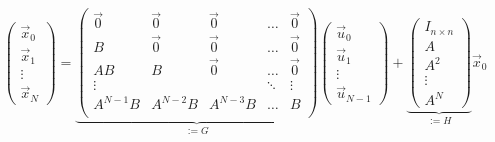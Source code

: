 \documentclass{article}
\begin{document}
\thispagestyle{empty}
$$
\begin{pmatrix}\vec{x}_0\\ \vec{x}_1 \\ \vdots \\ \vec{x}_N\end{pmatrix} =
\underbrace{\begin{pmatrix}
\vec{0}  & \vec{0}  & \vec{0}  & \dots  & \vec{0} \\
B        & \vec{0}  & \vec{0}  & \dots  & \vec{0} \\
AB       & B        & \vec{0}  & \dots  & \vec{0} \\
\vdots   &          &          & \ddots & \vdots  \\
A^{N-1}B & A^{N-2}B & A^{N-3}B & \dots  & B       \\
\end{pmatrix}}_{:= G}
\begin{pmatrix}\vec{u}_0\\ \vec{u}_1 \\ \vdots \\ \vec{u}_{N-1}\end{pmatrix} 
+
\underbrace{\begin{pmatrix}I_{n\times n}\\A\\A^2\\\vdots\\A^N\end{pmatrix}}_{:= H}\vec{x}_0
$$
\end{document}
